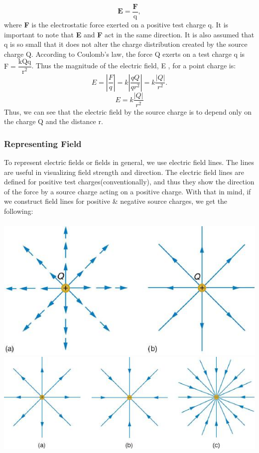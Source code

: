 \documentclass[9pt]{exam}
\begin{document}
	$$\mathbf{E}=\dfrac{\mathbf{F}}{\text{q}},$$ where  \textbf{F}  is the electrostatic force exerted on a positive test charge q.  It is important to note that  \textbf{E}  and \textbf{F} act in the same direction. It is also assumed that q is so small that it does not alter the charge distribution created by the source charge Q. According to Coulomb’s law, the force Q exerts on a test charge q is $\text{F}=\dfrac{\text{kQq}}{\text{r}^2}$. Thus the magnitude of the electric field, E , for a point charge is: 
	$$E=|\dfrac{F}{q}|=k|\dfrac{qQ}{qr^{2}}|=k\dfrac{|Q|}{r^{2}}.$$
	$$E=k\dfrac{|Q|}{r^{2}}$$
	Thus, we can see that the electric field by the source charge is to depend only on the charge Q and the distance r.
	\subsubsection*{Representing Field}
	To represent electric fields or fields in general, we use electric field lines. The lines are useful in visualizing field strength and direction. The electric field lines are defined for positive test charges(conventionally), and thus they show the direction of the force by a source charge acting on a positive charge. With that in mind, if we construct field lines for positive \& negative source charges, we get the following: \\ \\
	\includegraphics[scale=0.3]{source_p}\hspace{1in}\includegraphics[scale=0.4]{source_n} \\
\end{document}
